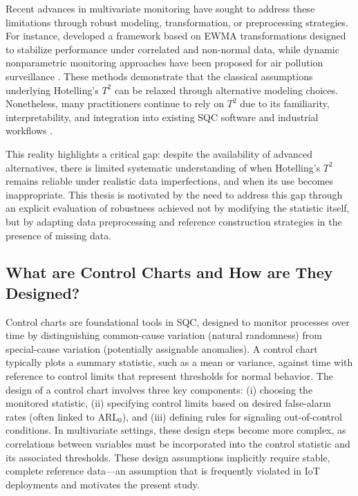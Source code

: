 Recent advances in multivariate monitoring have sought to address these limitations through robust modeling, transformation, or preprocessing strategies. For instance, \cite{Xie2024} developed a framework based on EWMA transformations designed to stabilize performance under correlated and non-normal data, while dynamic nonparametric monitoring approaches have been proposed for air pollution surveillance \cite{Xie2023}. These methods demonstrate that the classical assumptions underlying Hotelling’s $T^2$ can be relaxed through alternative modeling choices. Nonetheless, many practitioners continue to rely on $T^2$ due to its familiarity, interpretability, and integration into existing \ac{SQC} software and industrial workflows \cite{Kourti2005}.

This reality highlights a critical gap: despite the availability of advanced alternatives, there is limited systematic understanding of when Hotelling’s $T^2$ remains reliable under realistic data imperfections, and when its use becomes inappropriate. This thesis is motivated by the need to address this gap through an explicit evaluation of robustness achieved not by modifying the statistic itself, but by adapting data preprocessing and reference construction strategies in the presence of missing data.

\subsection{What are Control Charts and How are They Designed?}
Control charts are foundational tools in \ac{SQC}, designed to monitor processes over time by distinguishing common-cause variation (natural randomness) from special-cause variation (potentially assignable anomalies). A control chart typically plots a summary statistic, such as a mean or variance, against time with reference to control limits that represent thresholds for normal behavior. The design of a control chart involves three key components: (i) choosing the monitored statistic, (ii) specifying control limits based on desired false-alarm rates (often linked to ARL$_0$), and (iii) defining rules for signaling out-of-control conditions. In multivariate settings, these design steps become more complex, as correlations between variables must be incorporated into the control statistic and its associated thresholds.
These design assumptions implicitly require stable, complete reference data—an assumption that is frequently violated in IoT deployments and motivates the present study.

